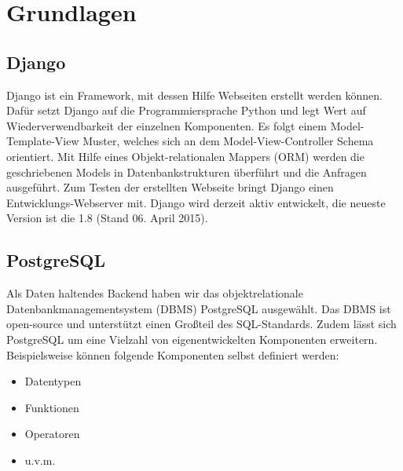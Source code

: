 \chapter{Grundlagen}
\section{Django}
\label{Django}
Django ist ein Framework, mit dessen Hilfe Webseiten erstellt werden können. Dafür setzt Django auf die Programmiersprache Python und legt Wert auf Wiederverwendbarkeit der einzelnen Komponenten. Es folgt einem Model-Template-View Muster, welches sich an dem Model-View-Controller Schema orientiert. Mit Hilfe eines Objekt-relationalen Mappers (ORM) werden die geschriebenen Models in Datenbankstrukturen überführt und die Anfragen ausgeführt. Zum Testen der erstellten Webseite bringt Django einen Entwicklungs-Webserver mit. Django wird derzeit aktiv entwickelt, die neueste Version ist die 1.8 (Stand 06. April 2015).

\section{PostgreSQL}
Als Daten haltendes Backend haben wir das objektrelationale Datenbankmanagementsystem (DBMS) PostgreSQL \cite{PostgreSQL2015} ausgewählt. Das DBMS ist open-source und unterstützt einen Großteil des SQL-Standards. Zudem lässt sich PostgreSQL um eine Vielzahl von eigenentwickelten Komponenten erweitern.\\

\noindent Beispielsweise können folgende Komponenten selbst definiert werden:
\begin{itemize}
\item Datentypen
\item Funktionen
\item Operatoren 
\item u.v.m.
\end{itemize}